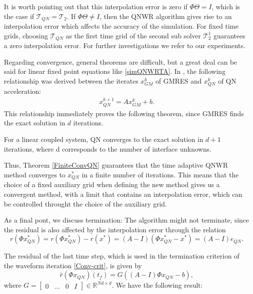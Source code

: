 It is worth pointing out that this interpolation error is zero if $\Phi \Theta = I$, which is the case if $\mathcal{T}_{QN} = \mathcal{T}_{2}$. If  $\Phi \Theta \neq I$, then the QNWR algorithm gives rise to an interpolation error which affects the accuracy of the simulation. For fixed time grids, choosing $\mathcal{T}_{QN}$ as the first time grid of the second sub solver $\mathcal{T}_2^1$ guarantees a zero interpolation error. For further investigations we refer to our experiments.  

Regarding convergence, general theorems are difficult, but a great deal can be said for linear fixed point equations like \eqref{simQNWRTA}. In \cite{HaDe10}, the following relationship was derived between the iterates $x^{k}_{GM}$ of GMRES and $x^{k}_{QN}$ of QN acceleration: 
\begin{align*}
	x^{k+1}_{QN} = A x^{k}_{GM} + b.
\end{align*} 
This relationship immediately proves the following theorem, since GMRES finds the exact solution in $d$ iterations.

\begin{theorem}\label{FiniteConvQN}
For a linear coupled system, QN converges to the exact solution in $d+1$ iterations, where d corresponds to the number of interface unknowns.
\end{theorem}

Thus, Theorem \ref{FiniteConvQN} guarantees that the time adaptive QNWR method converges to $x^*_{QN}$ in a finite number of iterations. This means that the choice of a fixed auxiliary grid when defining the new method gives us a convergent method, with a limit that contains an interpolation error, which can be controlled throught the choice of the auxiliary grid. 

As a final pont, we discuss termination: The algorithm might not terminate, since the residual is also affected by the interpolation error through the relation
\begin{equation*}
	r(\Phi x_{QN}^*) = r(\Phi x_{QN}^*)-r(x^*) = (A-I)(\Phi x_{QN}^*-x^*) = (A - I ) e_{QN}.
\end{equation*}

The residual of the last time step, which is used in the termination criterion of the waveform iteration \eqref{Conv-crit}, is given by
\begin{equation}\label{res}
\hat{r}(\Phi x_{QN})(t_f) = G \left( \left(A -I\right) \Phi x_{QN} - b \right),
\end{equation}
where $G = \begin{bmatrix}
	0 & \dots & 0 & I
\end{bmatrix} \in \mathbb{R}^{Nd \times d}$. We have the following result:

